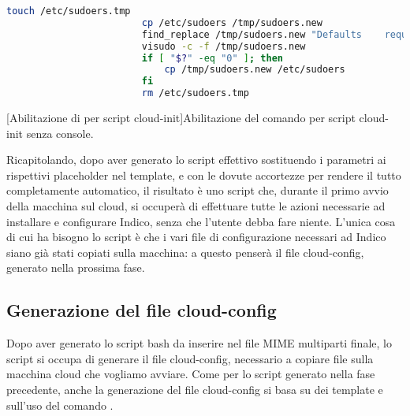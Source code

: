             \begin{center}
                \begin{minipage}{\linewidth}
                    \begin{lstlisting}[language=bash, gobble=22]
                        touch /etc/sudoers.tmp
                        cp /etc/sudoers /tmp/sudoers.new
                        find_replace /tmp/sudoers.new "Defaults    requiretty" "Defaults    !requiretty"
                        visudo -c -f /tmp/sudoers.new
                        if [ "$?" -eq "0" ]; then
                            cp /tmp/sudoers.new /etc/sudoers
                        fi
                        rm /etc/sudoers.tmp
                    \end{lstlisting}
                    \captionsetup{textformat=empty,labelformat=empty} \vspace{-2em}
                    [Abilitazione di  per script cloud-init]{Abilitazione del comando  per script cloud-init senza console.}
                \end{minipage}
            \end{center}
            
            Ricapitolando, dopo aver generato lo script effettivo sostituendo i parametri ai rispettivi placeholder nel template, e con le dovute accortezze per rendere il tutto completamente automatico, il risultato è uno script che, durante il primo avvio della macchina sul cloud, si occuperà di effettuare tutte le azioni necessarie ad installare e configurare Indico, senza che l'utente debba fare niente. L'unica cosa di cui ha bisogno lo script è che i vari file di configurazione necessari ad Indico siano già stati copiati sulla macchina: a questo penserà il file cloud-config, generato nella prossima fase.
        
        \subsection{Generazione del file cloud-config} \label{subsec:cd;dci;generazione_cloud-config}
        
            Dopo aver generato lo script bash da inserire nel file \ac{MIME} multiparti finale, lo script  si occupa di generare il file cloud-config, necessario a copiare file sulla macchina cloud che vogliamo avviare. Come per lo script generato nella fase precedente, anche la generazione del file cloud-config si basa su dei template e sull'uso del comando .
            
